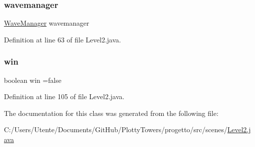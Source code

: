 \subsubsection{\texorpdfstring{wavemanager}{wavemanager}}
{\footnotesize\ttfamily \hyperlink{classmanagers_1_1_wave_manager}{Wave\+Manager} wavemanager\hspace{0.3cm}{\ttfamily [private]}}



Definition at line 63 of file Level2.\+java.

\mbox{\label{classscenes_1_1_level2_a1cc7b399bb950a160021766cd9a126f8}} 
\subsubsection{\texorpdfstring{win}{win}}
{\footnotesize\ttfamily boolean win =false\hspace{0.3cm}{\ttfamily [private]}}



Definition at line 105 of file Level2.\+java.



The documentation for this class was generated from the following file\+:\begin{DoxyCompactItemize}
\item 
C\+:/\+Users/\+Utente/\+Documents/\+Git\+Hub/\+Plotty\+Towers/progetto/src/scenes/\hyperlink{_level2_8java}{Level2.\+java}\end{DoxyCompactItemize}
